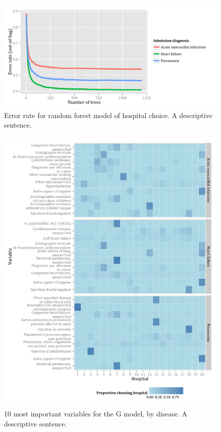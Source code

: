 \documentclass[]{article}
\begin{document}
\begin{figure}[H]
    \includegraphics{../figures/error_rate_for_hospital_choice.png}
    \caption[Error rate for random forest model of hospital choice.]
      {Error rate for random forest model of hospital choice. A descriptive sentence.}
    \label{fig:error_rate_for_hospital_choice}
\end{figure}

\begin{figure}[H]
    \includegraphics{../figures/top_10_variable_importance_and_hospital.png}
    \caption[Error rate for random forest model of hospital choice.]
      {10 most important variables for the G model, by disease. A descriptive sentence.}
    \label{fig:top_10_variable_importance_and_hospital}
\end{figure}
\end{document}
